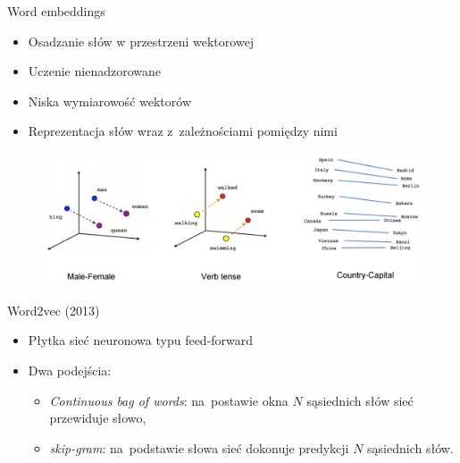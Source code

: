 \documentclass{beamer}
\begin{document}
	\begin{frame}{Word embeddings}
		\begin{itemize}
			\item Osadzanie słów w przestrzeni wektorowej
			\item Uczenie nienadzorowane
			\item Niska wymiarowość wektorów
			\item Reprezentacja słów wraz z~zależnościami pomiędzy nimi
		\end{itemize}

		\begin{figure}
			\centering
			\includegraphics[width=1\textwidth]{img/linear-relationships.png}
		\end{figure}
	\end{frame}
	\begin{frame}{Word2vec (2013)}
		\begin{itemize}
		\item Płytka sieć neuronowa typu feed-forward
		\item Dwa podejścia:
		\begin{itemize}
			\item \textit{Continuous bag of words}: na~postawie okna $N$ sąsiednich słów sieć przewiduje słowo,
			\item \textit{skip-gram}: na~podstawie słowa sieć dokonuje predykcji $N$ sąsiednich słów.
		\end{itemize}
		
		\end{itemize}
		
\end{frame}
\end{document}

